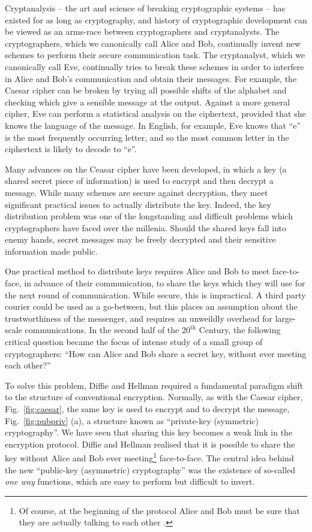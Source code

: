 Cryptanalysis -- the art and science of breaking cryptographic systems -- has existed for as long as cryptography, and history of cryptographic development can be viewed as an arms-race between cryptographers and cryptanalysts. The cryptographers, which we canonically call Alice and Bob, continually invent new schemes to perform their secure communication task. The cryptanalyst, which we canonically call Eve, continually tries to break these schemes in order to interfere in Alice and Bob's communication and obtain their messages. For example, the Caesar cipher can be broken by trying all possible shifts of the alphabet and checking which give a sensible message at the output. Against a more general cipher, Eve can perform a statistical analysis on the ciphertext, provided that she knows the language of the message. In English, for example, Eve knows that ``e'' is the most frequently occurring letter, and so the most common letter in the ciphertext is likely to decode to ``e''.

Many advances on the Ceasar cipher have been developed, in which a key (a shared secret piece of information) is used to encrypt and then decrypt a message. While many schemes are secure against decryption, they meet significant practical issues to actually distribute the key. Indeed, the key distribution problem was one of the longstanding and difficult problems which cryptographers have faced over the millenia. Should the shared keys fall into enemy hands, secret messages may be freely decrypted and their sensitive information made public. 

One practical method to distribute keys requires Alice and Bob to meet face-to-face, in advance of their communication, to share the keys which they will use for the next round of communication. While secure, this is impractical. A third party courier could be used as a go-between, but this places an assumption about the trustworthiness of the messenger, and requires an unweildly overhead for large-scale communications. In the second half of the $20^\text{th}$ Century, the following critical question became the focus of intense study of a small group of cryptographers: ``How can Alice and Bob share a secret key, without ever meeting each other?'' 

To solve this problem, Diffie and Hellman \cite{Diffie1976} required a fundamental paradigm shift to the structure of conventional encryption. Normally, as with the Caesar cipher, Fig.~\ref{fig:caesar}, the same key is used to encrypt and to decrypt the message, Fig.~\ref{fig:pubpriv} (a), a structure known as ``private-key (symmetric) cryptography''. We have seen that sharing this key becomes a weak link in the encryption protocol. Diffie and Hellman realised that it is possible to share the key without Alice and Bob ever meeting\footnote{Of course, at the beginning of the protocol Alice and Bob must be sure that they are actually talking to each other \cite{Shneier1996}.} face-to-face. The central idea behind the new ``public-key (asymmetric) cryptography'' was the existence of so-called \emph{one way} functions, which are easy to perform but difficult to invert. 

